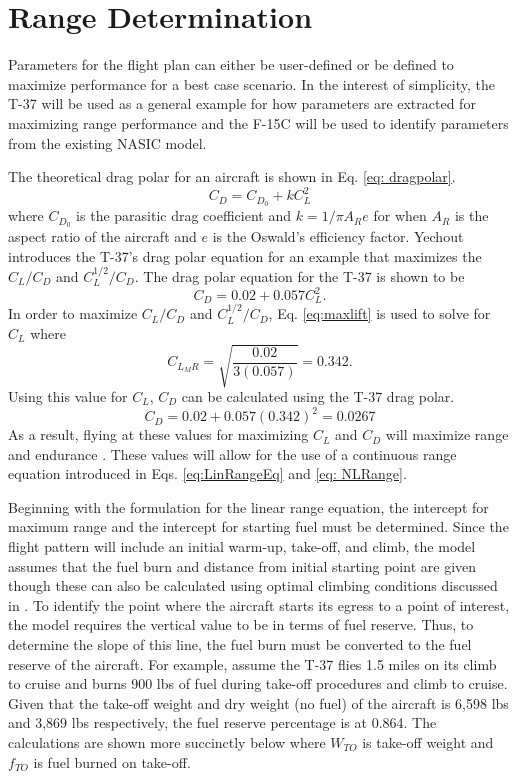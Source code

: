 \section{Range Determination}
Parameters for the flight plan can either be user-defined or be defined to maximize performance for a best case scenario. In the interest of simplicity, the T-37 will be used as a general example for how parameters are extracted for maximizing range performance and the F-15C will be used to identify parameters from the existing NASIC model. \par
The theoretical drag polar for an aircraft is shown in Eq. \ref{eq: dragpolar}.
\begin{equation}
    C_D = C_{D_0} + kC_L^2
    \label{eq: dragpolar}
\end{equation}
where $C_{D_0}$ is the parasitic drag coefficient and $k = 1/\pi A_Re$ for when $A_R$ is the aspect ratio of the aircraft and $e$ is the Oswald's efficiency factor. Yechout \cite{IntroACMechanics} introduces the T-37's drag polar equation for an example that maximizes the $C_L/C_D$ and $C_L^{1/2}/C_D$. The drag polar equation for the T-37 is shown to be  
\begin{equation*}
    C_D = 0.02 + 0.057C_L^2.
\end{equation*}
In order to maximize $C_L/C_D$ and $C_L^{1/2}/C_D$, Eq. \ref{eq:maxlift} is used to solve for $C_L$ where
\begin{equation*}
    C_{L_MR} = \sqrt{\dfrac{0.02}{3(0.057)}} = 0.342.
\end{equation*}
Using this value for $C_L$, $C_D$ can be calculated using the T-37 drag polar.
\begin{equation*}
    C_D = 0.02 + 0.057(0.342)^2 = 0.0267
\end{equation*}
As a result, flying at these values for maximizing $C_L$ and $C_D$ will maximize range and endurance \cite{IntrotoAero}. These values will allow for the use of a continuous range equation introduced in Eqs. \ref{eq:LinRangeEq} and \ref{eq: NLRange}. \par
Beginning with the formulation for the linear range equation, the intercept for maximum range and the intercept for starting fuel must be determined. Since the flight pattern will include an initial warm-up, take-off, and climb, the model assumes that the fuel burn and distance from initial starting point are given though these can also be calculated using optimal climbing conditions discussed in \cite{IntroACMechanics}. To identify the point where the aircraft starts its egress to a point of interest, the model requires the vertical value to be in terms of fuel reserve. Thus, to determine the slope of this line, the fuel burn must be converted to the fuel reserve of the aircraft. For example, assume the T-37 flies 1.5 miles on its climb to cruise and burns 900 lbs of fuel during take-off procedures and climb to cruise. Given that the take-off weight and dry weight (no fuel) of the aircraft is 6,598 lbs and 3,869 lbs respectively, the fuel reserve percentage is at 0.864. The calculations are shown more succinctly below where $W_{TO}$ is take-off weight and $f_{TO}$ is fuel burned on take-off.

